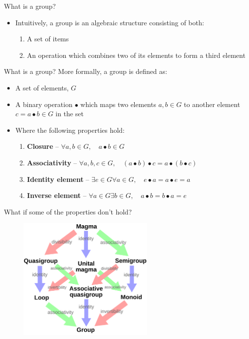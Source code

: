 \documentclass{beamer}
\begin{document}
\begin{frame}{What is a group?}
    \begin{itemize}
        \item Intuitively, a group is an algebraic structure consisting of both:
        \vskip 1cm
        \begin{enumerate}
            \item A set of items
            \item An operation which combines two of its elements to form a third element
        \end{enumerate}
    \end{itemize}
\end{frame}

\begin{frame}{What is a group?}
    More formally, a group is defined as:
    \begin{itemize}
        \item A set of elements, $G$
        \item A binary operation $\bullet$ which maps two elements $a,b \in G$ to another element $c = a \bullet b \in G$ in the set
        \item Where the following properties hold:
        \begin{enumerate}
            \item \textbf{Closure} -- $\forall a,b \in G, \quad a \bullet b \in G$
            \item \textbf{Associativity} -- $\forall a,b,c \in G, \quad (a \bullet b) \bullet c = a \bullet (b \bullet c)$
            \item \textbf{Identity element} -- $\exists e \in G \forall a \in G, \quad e \bullet a = a \bullet e = a$
            \item \textbf{Inverse element} -- $\forall a \in G \exists b \in G, \quad a \bullet b = b \bullet a = e$
        \end{enumerate}
    \end{itemize}
\end{frame}

\begin{frame}{What if some of the properties don't hold?}
    \begin{figure}
        \includegraphics[width=0.6\textwidth]{algebraic_structures.png}
        \label{fig:algebraic-structures-2}
    \end{figure}
\end{frame}
\end{document}
